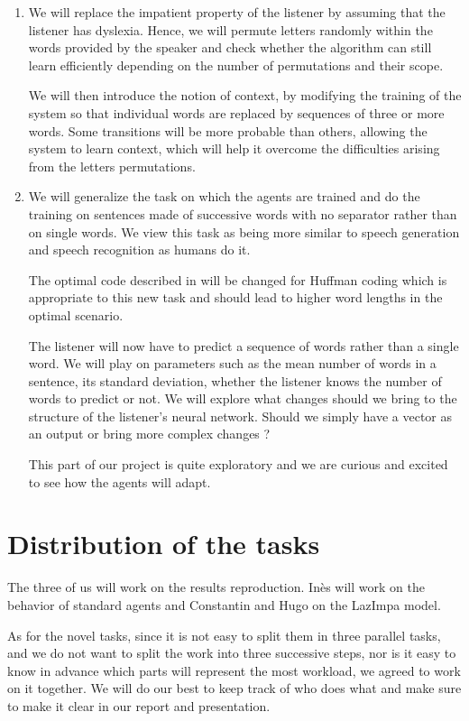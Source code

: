 \documentclass{amsart}
\theoremstyle{definition}
\theoremstyle{plain}
\begin{document}
\begin{enumerate}

    \item We will replace the impatient property of the listener by assuming that the listener has dyslexia. Hence, we will permute letters randomly within the words provided by the speaker and check whether the algorithm can still learn efficiently depending on the number of permutations and their scope. 
    
    We will then introduce the notion of context, by modifying the training of the system so that individual words are replaced by sequences of three or more words. Some transitions will be more probable than others, allowing the system to learn context, which will help it overcome the difficulties arising from the letters permutations.
    \\
    \item We will generalize the task on which the agents are trained and do the training on sentences made of successive words with no separator rather than on single words. We view this task as being more similar to speech generation and speech recognition as humans do it.
    
    The optimal code described in \cite{chaabouni2019anti} will be changed for Huffman coding which is appropriate to this new task and should lead to higher word lengths in the optimal scenario.
    
    The listener will now have to predict a sequence of words rather than a single word. We will play on parameters such as the mean number of words in a sentence, its standard deviation, whether the listener knows the number of words to predict or not. We will explore what changes should we bring to the structure of the listener's neural network. Should we simply have a vector as an output or bring more complex changes ? 
    
    This part of our project is quite exploratory and we are curious and excited to see how the agents will adapt.
    
\end{enumerate}

\section{Distribution of the tasks}

The three of us will work on the results reproduction. Inès will work on the behavior of standard agents and Constantin and Hugo on the LazImpa model. 

As for the novel tasks, since it is not easy to split them in three parallel tasks, and we do not want to split the work into three successive steps, nor is it easy to know in advance which parts will represent the most workload, we agreed to work on it together. We will do our best to keep track of who does what and make sure to make it clear in our report and presentation.


\printbibliography
\end{document}
